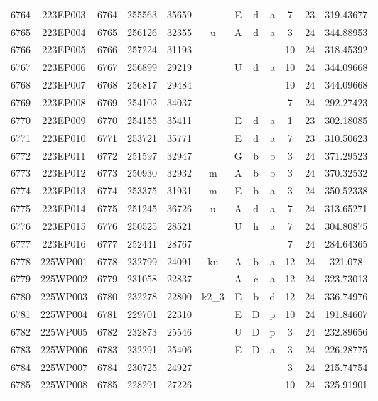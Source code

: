 \begin{tabular}{|*{12}{c|}}
6764 & 223EP003 & 6764 & 255563 & 35659 &  & E & d & a & 7 & 23 & 319.43677 \\ 
6765 & 223EP004 & 6765 & 256126 & 32355 & u & A & d & a & 3 & 24 & 344.88953 \\ 
6766 & 223EP005 & 6766 & 257224 & 31193 &  &  &  &  & 10 & 24 & 318.45392 \\ 
6767 & 223EP006 & 6767 & 256899 & 29219 &  & U & d & a & 10 & 24 & 344.09668 \\ 
6768 & 223EP007 & 6768 & 256817 & 29484 &  &  &  &  & 10 & 24 & 344.09668 \\ 
6769 & 223EP008 & 6769 & 254102 & 34037 &  &  &  &  & 7 & 24 & 292.27423 \\ 
6770 & 223EP009 & 6770 & 254155 & 35411 &  & E & d & a & 1 & 23 & 302.18085 \\ 
6771 & 223EP010 & 6771 & 253721 & 35771 &  & E & d & a & 7 & 23 & 310.50623 \\ 
6772 & 223EP011 & 6772 & 251597 & 32947 &  & G & b & b & 3 & 24 & 371.29523 \\ 
6773 & 223EP012 & 6773 & 250930 & 32932 & m & A & b & b & 3 & 24 & 370.32532 \\ 
6774 & 223EP013 & 6774 & 253375 & 31931 & m & E & b & a & 3 & 24 & 350.52338 \\ 
6775 & 223EP014 & 6775 & 251245 & 36726 & u & A & d & a & 7 & 24 & 313.65271 \\ 
6776 & 223EP015 & 6776 & 250525 & 28521 &  & U & h & a & 7 & 24 & 304.80875 \\ 
6777 & 223EP016 & 6777 & 252441 & 28767 &  &  &  &  & 7 & 24 & 284.64365 \\ 
6778 & 225WP001 & 6778 & 232799 & 24091 & ku & A & b & a & 12 & 24 & 321.078 \\ 
6779 & 225WP002 & 6779 & 231058 & 22837 &  & A & c & a & 12 & 24 & 323.73013 \\ 
6780 & 225WP003 & 6780 & 232278 & 22800 & k2\_3 & E & b & d & 12 & 24 & 336.74976 \\ 
6781 & 225WP004 & 6781 & 229701 & 22310 &  & E & D & p & 10 & 24 & 191.84607 \\ 
6782 & 225WP005 & 6782 & 232873 & 25546 &  & U & D & p & 3 & 24 & 232.89656 \\ 
6783 & 225WP006 & 6783 & 232291 & 25406 &  & E & D & a & 3 & 24 & 226.28775 \\ 
6784 & 225WP007 & 6784 & 230725 & 24927 &  &  &  &  & 3 & 24 & 215.74754 \\ 
6785 & 225WP008 & 6785 & 228291 & 27226 &  &  &  &  & 10 & 24 & 325.91901 \\ 

\end{tabular}
